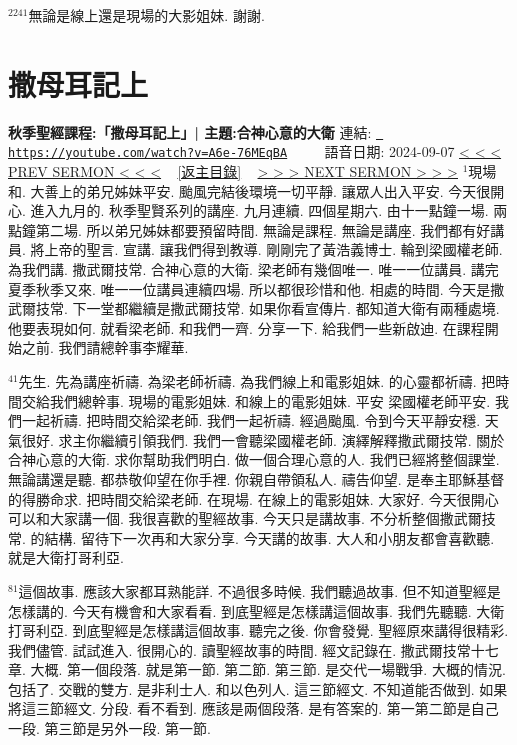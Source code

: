 \documentclass{book}
\begin{document}
$^{2241}$無論是線上還是現場的大影姐妹.
謝謝.
\newpage



\section{撒母耳記上}
\label{sec:A6e_76MEqBA}
\textbf{秋季聖經課程:「撒母耳記上」| 主題:合神心意的大衛}
\newline
\newline
連結: \href{https://youtube.com/watch?v=A6e-76MEqBA}{\texttt{ https://youtube.com/watch?v=A6e-76MEqBA}} ~~~~ 語音日期: 2024-09-07 
\newline
\newline
\hyperref[sec:ltLox1aivp8]{\small{< < < PREV SERMON < < <}}
~
\hyperref[sec:index]{\small{[返主目錄]}}
~
\hyperref[sec:x3lU8yQeNU8]{\small{> > > NEXT SERMON > > >}}
\newline
\newline
$^{1}$現場和.
大善上的弟兄姊妹平安.
颱風完結後環境一切平靜.
讓眾人出入平安.
今天很開心.
進入九月的.
秋季聖賢系列的講座.
九月連續.
四個星期六.
由十一點鐘一場.
兩點鐘第二場.
所以弟兄姊妹都要預留時間.
無論是課程.
無論是講座.
我們都有好講員.
將上帝的聖言.
宣講.
讓我們得到教導.
剛剛完了黃浩義博士.
輪到梁國權老師.
為我們講.
撒武爾技常.
合神心意的大衛.
梁老師有幾個唯一.
唯一一位講員.
講完夏季秋季又來.
唯一一位講員連續四場.
所以都很珍惜和他.
相處的時間.
今天是撒武爾技常.
下一堂都繼續是撒武爾技常.
如果你看宣傳片.
都知道大衛有兩種處境.
他要表現如何.
就看梁老師.
和我們一齊.
分享一下.
給我們一些新啟迪.
在課程開始之前.
我們請總幹事李耀華.

$^{41}$先生.
先為講座祈禱.
為梁老師祈禱.
為我們線上和電影姐妹.
的心靈都祈禱.
把時間交給我們總幹事.
現場的電影姐妹.
和線上的電影姐妹.
平安 梁國權老師平安.
我們一起祈禱.
把時間交給梁老師.
我們一起祈禱.
經過颱風.
令到今天平靜安穩.
天氣很好.
求主你繼續引領我們.
我們一會聽梁國權老師.
演繹解釋撒武爾技常.
關於合神心意的大衛.
求你幫助我們明白.
做一個合理心意的人.
我們已經將整個課堂.
無論講還是聽.
都恭敬仰望在你手裡.
你親自帶領私人.
禱告仰望.
是奉主耶穌基督的得勝命求.
把時間交給梁老師.
在現場.
在線上的電影姐妹.
大家好.
今天很開心可以和大家講一個.
我很喜歡的聖經故事.
今天只是講故事.
不分析整個撒武爾技常.
的結構.
留待下一次再和大家分享.
今天講的故事.
大人和小朋友都會喜歡聽.
就是大衛打哥利亞.

$^{81}$這個故事.
應該大家都耳熟能詳.
不過很多時候.
我們聽過故事.
但不知道聖經是怎樣講的.
今天有機會和大家看看.
到底聖經是怎樣講這個故事.
我們先聽聽.
大衛打哥利亞.
到底聖經是怎樣講這個故事.
聽完之後.
你會發覺.
聖經原來講得很精彩.
我們儘管.
試試進入.
很開心的.
讀聖經故事的時間.
經文記錄在.
撒武爾技常十七章.
大概.
第一個段落.
就是第一節.
第二節.
第三節.
是交代一場戰爭.
大概的情況.
包括了.
交戰的雙方.
是非利士人.
和以色列人.
這三節經文.
不知道能否做到.
如果將這三節經文.
分段.
看不看到.
應該是兩個段落.
是有答案的.
第一第二節是自己一段.
第三節是另外一段.
第一節.
\end{document}
